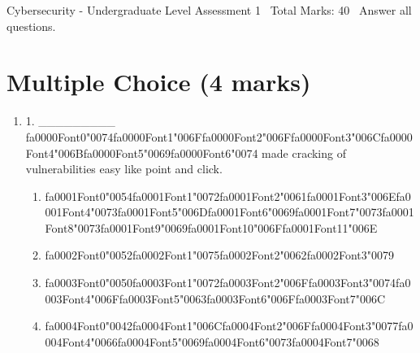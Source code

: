 \documentclass[12pt]{article}
\begin{document}
\begin{center}
Cybersecurity - Undergraduate Level Assessment 1 \
Total Marks: 40 \
Answer all questions.
\end{center}

\section*{Multiple Choice (4 marks)}
\begin{enumerate}[label=\arabic*.]
\item 1. \_\_\_\_\_\_\_\_\_ {\csname fa0000Font0\endcsname\char"0074}{\csname fa0000Font1\endcsname\char"006F}{\csname fa0000Font2\endcsname\char"006F}{\csname fa0000Font3\endcsname\char"006C}{\csname fa0000Font4\endcsname\char"006B}{\csname fa0000Font5\endcsname\char"0069}{\csname fa0000Font6\endcsname\char"0074} made cracking of vulnerabilities easy like point and click.
\begin{enumerate}[label=(\alph*)]
    \item {\csname fa0001Font0\endcsname\char"0054}{\csname fa0001Font1\endcsname\char"0072}{\csname fa0001Font2\endcsname\char"0061}{\csname fa0001Font3\endcsname\char"006E}{\csname fa0001Font4\endcsname\char"0073}{\csname fa0001Font5\endcsname\char"006D}{\csname fa0001Font6\endcsname\char"0069}{\csname fa0001Font7\endcsname\char"0073}{\csname fa0001Font8\endcsname\char"0073}{\csname fa0001Font9\endcsname\char"0069}{\csname fa0001Font10\endcsname\char"006F}{\csname fa0001Font11\endcsname\char"006E}
    \item {\csname fa0002Font0\endcsname\char"0052}{\csname fa0002Font1\endcsname\char"0075}{\csname fa0002Font2\endcsname\char"0062}{\csname fa0002Font3\endcsname\char"0079}
    \item {\csname fa0003Font0\endcsname\char"0050}{\csname fa0003Font1\endcsname\char"0072}{\csname fa0003Font2\endcsname\char"006F}{\csname fa0003Font3\endcsname\char"0074}{\csname fa0003Font4\endcsname\char"006F}{\csname fa0003Font5\endcsname\char"0063}{\csname fa0003Font6\endcsname\char"006F}{\csname fa0003Font7\endcsname\char"006C}
    \item {\csname fa0004Font0\endcsname\char"0042}{\csname fa0004Font1\endcsname\char"006C}{\csname fa0004Font2\endcsname\char"006F}{\csname fa0004Font3\endcsname\char"0077}{\csname fa0004Font4\endcsname\char"0066}{\csname fa0004Font5\endcsname\char"0069}{\csname fa0004Font6\endcsname\char"0073}{\csname fa0004Font7\endcsname\char"0068}
\end{enumerate}

\end{enumerate}
\end{document}
